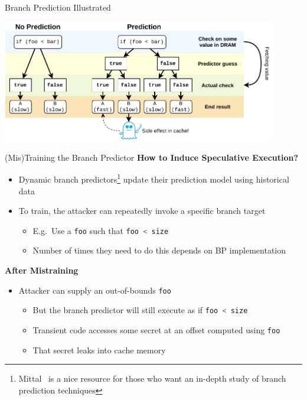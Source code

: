 \documentclass[10pt, dvipsnames, aspectratio=169]{beamer}
\let\lsi\lstinline
\newcommand{\code}[1]{\lsi[language=c]|#1|}
\begin{document}
\begingroup
\setwatermark{}
\begin{frame}[c]{Branch Prediction Illustrated}
  \begin{center}
    \color{black}
    \includegraphics[width=0.9\textwidth]{figs/prediction.pdf}
  \end{center}
\end{frame}
\endgroup

\begin{frame}[c]{(Mis)Training the Branch Predictor}{}
  {\bf How to Induce Speculative Execution?}
  \begin{itemize}
    \item Dynamic branch predictors\footnote{Mittal~\cite{mittal2019_branch_prediction} is a nice resource for those who want an in-depth study of branch prediction techniques} update their prediction model using historical data
    \item To train, the attacker can repeatedly invoke a specific branch target
    \begin{itemize}
      \item E.g.~Use a \code{foo} such that \code{foo < size}
      \item Number of times they need to do this depends on BP implementation
    \end{itemize}
  \end{itemize}

  \vfill
  {\bf After Mistraining}
  \begin{itemize}
    \item Attacker can supply an out-of-bounds \code{foo}
    \begin{itemize}
      \item But the branch predictor will still execute as if \code{foo < size}
      \item Transient code accesses some secret at an offset computed using \code{foo}
      \item That secret leaks into cache memory
    \end{itemize}
  \end{itemize}
\end{frame}
\end{document}
